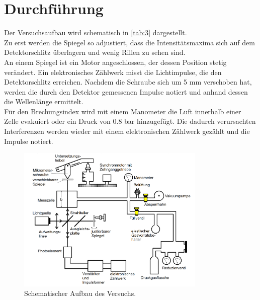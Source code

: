 \section{Durchführung}
\label{sec:Durchführung}

Der Versuchsaufbau wird schematisch in \autoref{tab:3} dargestellt.\\
Zu erst werden die Spiegel so adjustiert, dass die Intensitätsmaxima sich auf dem Detektorschlitz überlagern und wenig Rillen zu sehen sind. \\
An einem Spiegel ist ein Motor angeschlossen, der dessen Position stetig verändert. Ein elektronisches Zählwerk misst die Lichtimpulse, die den Detektorschlitz erreichen. Nachdem die Schraube sich um 5 mm verschoben hat, werden die durch den Detektor gemessenen Impulse notiert und anhand dessen die Wellenlänge ermittelt.\\
Für den Brechungsindex wird mit einem Manometer die Luft innerhalb einer Zelle evakuiert oder ein Druck von 0.8 bar hinzugefügt. Die dadurch verursachten Interferenzen werden wieder mit einem elektronischen Zählwerk gezählt und die Impulse notiert.
\begin{figure}[H]
  \centering
  \includegraphics[width=9cm]{3.png}
  \caption{Schematischer Aufbau des Versuchs.}
  \label{tab:3}
\end{figure}
